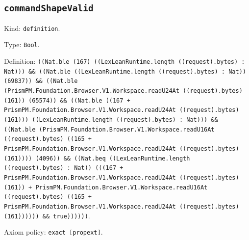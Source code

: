\documentclass[11pt]{article}
\begin{document}
\subsection*{\texttt{commandShapeValid}}
\noindent Kind: \texttt{definition}.\par
\noindent Type: \texttt{Bool}.\par
\noindent Definition: \texttt{((Nat.ble (167) ((LexLeanRuntime.length ((request).bytes) : Nat))) \&\& ((Nat.ble ((LexLeanRuntime.length ((request).bytes) : Nat)) (69837)) \&\& ((Nat.ble (PrismPM.Foundation.Browser.V1.Workspace.readU24At ((request).bytes) (161)) (65574)) \&\& ((Nat.ble ((167 + PrismPM.Foundation.Browser.V1.Workspace.readU24At ((request).bytes) (161))) ((LexLeanRuntime.length ((request).bytes) : Nat))) \&\& ((Nat.ble (PrismPM.Foundation.Browser.V1.Workspace.readU16At ((request).bytes) ((165 + PrismPM.Foundation.Browser.V1.Workspace.readU24At ((request).bytes) (161)))) (4096)) \&\& ((Nat.beq ((LexLeanRuntime.length ((request).bytes) : Nat)) (((167 + PrismPM.Foundation.Browser.V1.Workspace.readU24At ((request).bytes) (161)) + PrismPM.Foundation.Browser.V1.Workspace.readU16At ((request).bytes) ((165 + PrismPM.Foundation.Browser.V1.Workspace.readU24At ((request).bytes) (161)))))) \&\& true))))))}.\par
\noindent Axiom policy: \texttt{exact [propext]}.\par
\end{document}

